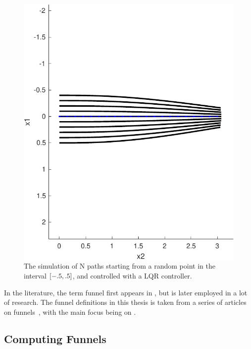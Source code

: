 \begin{figure}[!t]
  \centering \includegraphics[scale=.6]{figures/preliminaries/montecarlofunnel}
  \caption[Monte-Carlo simulation of the funnel for the \ac{LQR}-controller]{The simulation of N paths starting from a random point in the
    interval \(\lbrack-.5,.5\rbrack\), and controlled with a LQR controller.}
  \label{fig:monte-carlo-sim}
\end{figure}

In the literature, the term funnel first appears in
\cite{masonMechanicsManipulation1985}, but is later employed in a lot of
research. The funnel definitions in this thesis is taken from a series of
articles on funnels~\cite{Tobenkin_2011,tedrakeLQRtreesFeedbackMotion2009,
  majumdarRobustOnlineMotion2013,
  majumdarFunnelLibrariesRealtime2017,ahmadi2014dsos}, with the main focus being
on \cite{majumdarFunnelLibrariesRealtime2017}.


\subsection{Computing Funnels}

